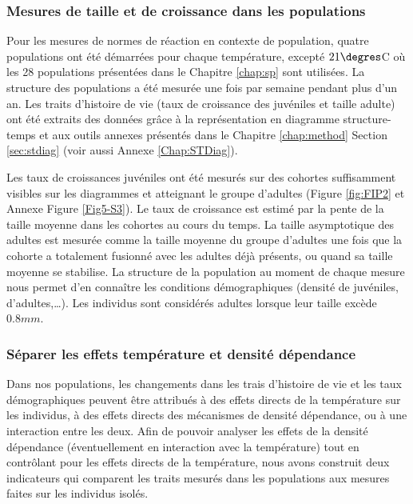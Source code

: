 \subsubsection{Mesures de taille et de croissance dans les populations}

Pour les mesures de normes de réaction en contexte de population, quatre
populations ont été démarrées pour chaque température, excepté $21\degres$C où
les 28 populations présentées dans le Chapitre \ref{chap:sp} sont utilisées. La
structure des populations a été mesurée une fois par semaine pendant plus d'un
an. Les traits d'histoire de vie (taux de croissance des juvéniles et taille
adulte) ont été extraits des données grâce à la représentation en diagramme
structure-temps et aux outils annexes présentés dans le Chapitre
\ref{chap:method} Section \ref{sec:stdiag} (voir aussi Annexe \ref{Chap:STDiag}). 

Les taux de croissances juvéniles ont été mesurés sur des cohortes suffisamment
visibles sur les diagrammes et atteignant le groupe d'adultes (Figure
\ref{fig:FIP2} et Annexe Figure \ref{Fig5-S3}).
Le taux de croissance est estimé par la pente de la taille moyenne dans les cohortes au
cours du temps. La taille asymptotique des adultes est mesurée comme la taille
moyenne du groupe d'adultes une fois que la cohorte a totalement fusionné avec
les adultes déjà présents, ou quand sa taille moyenne se stabilise. La structure
de la population au moment de chaque mesure nous permet d'en connaître les
conditions démographiques (densité de juvéniles, d'adultes,\ldots). Les
individus sont considérés adultes lorsque leur taille excède $0.8mm$.

\subsubsection{Séparer les effets température et densité dépendance}

Dans nos populations, les changements dans les trais d'histoire de vie et les
taux démographiques peuvent être attribués à des effets directs de la
température sur les individus, à des effets directs des mécanismes de densité dépendance, ou
à une interaction entre les deux. Afin de pouvoir analyser les effets de la
densité dépendance (éventuellement en interaction avec la température) tout en
contrôlant pour les effets directs de la température, nous avons construit deux
indicateurs qui comparent les traits mesurés dans les populations aux mesures
faites sur les individus isolés. 

